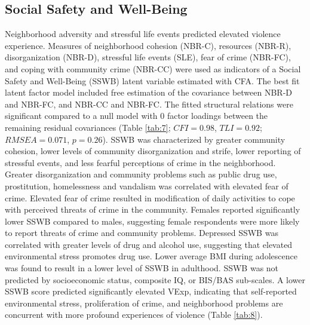 \documentclass[utf8]{article}
\begin{document}
\subsection*{Social Safety and Well-Being} Neighborhood adversity and stressful life events predicted elevated violence experience. Measures of neighborhood cohesion (NBR-C), resources (NBR-R), disorganization (NBR-D), stressful life events (SLE), fear of crime (NBR-FC), and coping with community crime (NBR-CC) were used as indicators of a Social Safety and Well-Being (SSWB) latent variable estimated with CFA. The best fit latent factor model included free estimation of the covariance between NBR-D and NBR-FC, and NBR-CC and NBR-FC. The fitted structural relations were significant compared to a null model with $0$ factor loadings between the remaining residual covariances (Table \ref{tab:7}; $CFI=0.98$, $TLI=0.92$; $RMSEA=0.071$, $p=0.26$). SSWB was characterized by greater community cohesion, lower levels of community disorganization and strife, lower reporting of stressful events, and less fearful perceptions of crime in the neighborhood. Greater disorganization and community problems such as public drug use, prostitution, homelessness and vandalism was correlated with elevated fear of crime. Elevated fear of crime resulted in modification of daily activities to cope with perceived threats of crime in the community. Females reported significantly lower SSWB compared to males, suggesting female respondents were more likely to report threats of crime and community problems. Depressed SSWB was correlated with greater levels of drug and alcohol use, suggesting that elevated environmental stress promotes drug use. Lower average BMI during adolescence was found to result in a lower level of SSWB in adulthood. SSWB was not predicted by socioeconomic status, composite IQ, or BIS/BAS sub-scales. A lower SSWB score predicted significantly elevated VExp, indicating that self-reported environmental stress, proliferation of crime, and neighborhood problems are concurrent with more profound experiences of violence (Table \ref{tab:8}). 
%
\end{document}

